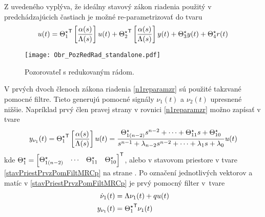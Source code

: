 \documentclass[a4paper, 10pt, ]{article}
\begin{document}
Z uvedeného vyplýva, že ideálny stavový zákon riadenia použitý v predchádzajúcich častiach je možné re-parametrizovať do tvaru
\begin{equation} \label{n1reparamzr}
	u(t)
	=
	{\Theta_1^\star}^{\mathsf{T}} \left[ \frac{\alpha(s)}{\Lambda(s)} \right] u(t)
	+
	{\Theta_2^\star}^{\mathsf{T}} \left[ \frac{\alpha(s)}{\Lambda(s)} \right] y(t)
	+
	\Theta_3^\star y(t)
	+
	\Theta_4^\star r(t)
\end{equation}








\begin{figure}[t]
    \centering
    \texttt{[image: Obr\_PozRedRad\_standalone.pdf]}
    \caption{Pozorovateľ s redukovaným rádom.}
    \label{Obr_PozRedRad}
\end{figure}











V prvých dvoch členoch zákona riadenia \eqref{n1reparamzr} sú použité takzvané pomocné filtre. Tieto generujú pomocné signály $\nu_1(t)$ a $\nu_2(t)$ upresnené nižšie. Napríklad prvý člen pravej strany v rovnici \eqref{n1reparamzr} možno zapísať v tvare
\begin{equation}
	y_{\nu_1}(t) = {\Theta_1^\star}^{\mathsf{T}} \left[\frac{\alpha(s)}{\Lambda(s)}\right] u(t)
	=
	\frac{
	\Theta_{1(n-2)}^\star s^{n-2}    + \cdots + \Theta_{11}^\star s + \Theta_{10}^\star
	}{
	s^{n-1}+ \lambda_{n-2} s^{n-2} + \cdots + \lambda_1 s + \lambda_0
	}
	u(t)
\end{equation}
kde $ \Theta_1^\star = \begin{bmatrix} \Theta_{1(n-2)}^\star  & \cdots & \Theta_{11}^\star & \Theta_{10}^\star \end{bmatrix}^{\mathsf{T}} $, alebo v stavovom priestore v tvare \eqref{stavPriestPrvzPomFiltMRCp} na strane \pageref{stavPriestPrvzPomFiltMRCp}. Po označení jednotlivých vektorov a matíc v \eqref{stavPriestPrvzPomFiltMRCp} je prvý pomocný filter v~tvare
\begin{subequations}
	\begin{align}
		\dot \nu_1(t)
		&=
		\Lambda
		\nu_1(t)
		+
		q
		u(t)
		\\
		y_{\nu_1}(t)
		&=
		{\Theta_1^\star}^{\mathsf{T}}
		\nu_1(t)
	\end{align}
\end{subequations}
\end{document}

